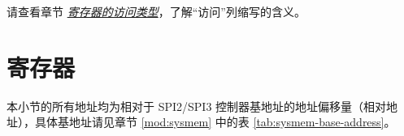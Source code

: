 \documentclass[main\_\_CN.tex]{subfiles}
\begin{document}
请查看章节 \hyperref[glossary-access-types]{\textit{寄存器的访问类型}}，了解“访问”列缩写的含义。




\section{寄存器}\label{Section:SPIREGList}

本小节的所有地址均为相对于 SPI2/SPI3 控制器基地址的地址偏移量（相对地址），具体基地址请见章节  \ref{mod:sysmem} \textit{} 中的表  \ref{tab:sysmem-base-address}。


\end{document}
